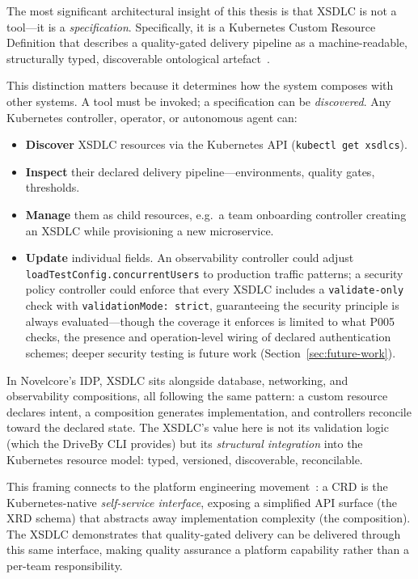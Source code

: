 The most significant architectural insight of this thesis is that XSDLC is not a tool---it is a \textit{specification}. Specifically, it is a Kubernetes Custom Resource Definition that describes a quality-gated delivery pipeline as a machine-readable, structurally typed, discoverable ontological artefact~\cite{gruber-ontology}.

This distinction matters because it determines how the system composes with other systems. A tool must be invoked; a specification can be \textit{discovered}. Any Kubernetes controller, operator, or autonomous agent can:

\begin{itemize}
    \item \textbf{Discover} XSDLC resources via the Kubernetes API (\texttt{kubectl get xsdlcs}).
    \item \textbf{Inspect} their declared delivery pipeline---environments, quality gates, thresholds.
    \item \textbf{Manage} them as child resources, e.g.\ a team onboarding controller creating an XSDLC while provisioning a new microservice.
    \item \textbf{Update} individual fields. An observability controller could adjust \texttt{loadTestConfig.concurrentUsers} to production traffic patterns; a security policy controller could enforce that every XSDLC includes a \texttt{validate-only} check with \texttt{validationMode: strict}, guaranteeing the security principle is always evaluated---though the coverage it enforces is limited to what P005 checks, the presence and operation-level wiring of declared authentication schemes; deeper security testing is future work (Section~\ref{sec:future-work}).
\end{itemize}

In Novelcore's IDP, XSDLC sits alongside database, networking, and observability compositions, all following the same pattern: a custom resource declares intent, a composition generates implementation, and controllers reconcile toward the declared state. The XSDLC's value here is not its validation logic (which the DriveBy CLI provides) but its \textit{structural integration} into the Kubernetes resource model: typed, versioned, discoverable, reconcilable.

This framing connects to the platform engineering movement~\cite{humanitec-platform-engineering, team-topologies}: a CRD is the Kubernetes-native \textit{self-service interface}, exposing a simplified API surface (the XRD schema) that abstracts away implementation complexity (the composition). The XSDLC demonstrates that quality-gated delivery can be delivered through this same interface, making quality assurance a platform capability rather than a per-team responsibility.

